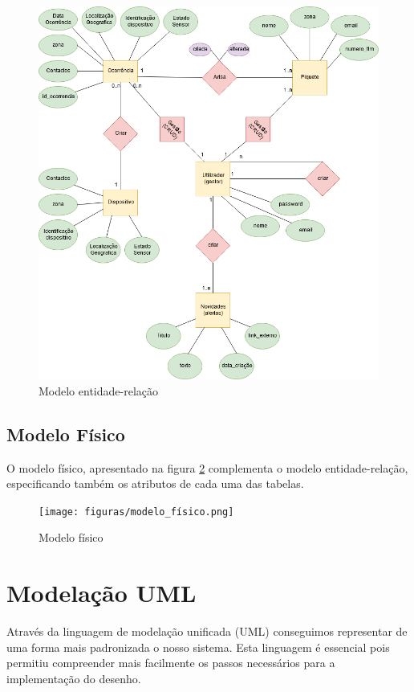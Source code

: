 \begin{figure}[!htb]
	\centering
	\includegraphics[width=\textwidth]{figuras/diagrama_e-r.png}
	\caption{Modelo entidade-relação}
	\label{fig:Modelo_E/R}
\end{figure}

\FloatBarrier\subsection{Modelo Físico}

O modelo físico, apresentado na figura \ref{fig:Modelo_fisico} complementa o modelo entidade-relação, especificando também os atributos de cada uma das tabelas.

\begin{figure}[!htb]
	\centering
	\texttt{[image: figuras/modelo\_físico.png]}
	\caption{Modelo físico}
	\label{fig:Modelo_fisico}
\end{figure}

\FloatBarrier\section{Modelação UML}

Através da linguagem de modelação unificada (UML) conseguimos representar de uma forma mais padronizada o nosso sistema. Esta linguagem é essencial pois permitiu compreender mais facilmente os passos necessários para a implementação do desenho.

